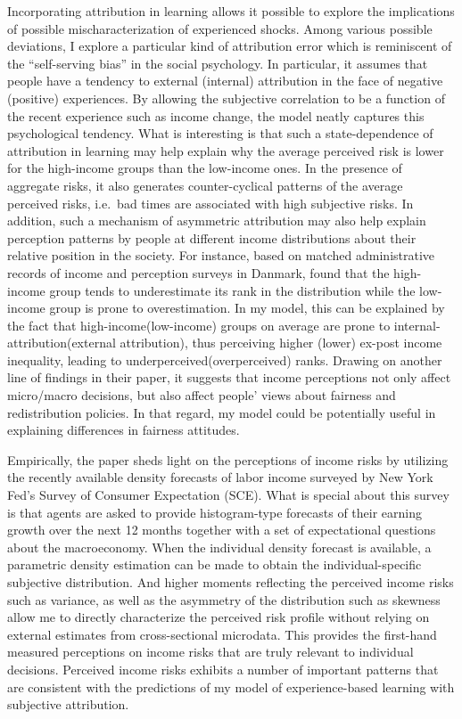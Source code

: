 \documentclass[12pt,notitlepage,onecolumn,aps,pra]{article}
\begin{document}
Incorporating attribution in learning allows it possible to explore the
implications of possible mischaracterization of experienced shocks.
Among various possible deviations, I explore a particular kind of
attribution error which is reminiscent of the ``self-serving bias'' in
the social psychology. In particular, it assumes that people have a
tendency to external (internal) attribution in the face of negative
(positive) experiences. By allowing the subjective correlation to be a
function of the recent experience such as income change, the model
neatly captures this psychological tendency. What is interesting is that
such a state-dependence of attribution in learning may help explain why
the average perceived risk is lower for the high-income groups than the
low-income ones. In the presence of aggregate risks, it also generates
counter-cyclical patterns of the average perceived risks, i.e.~bad times
are associated with high subjective risks. In addition, such a mechanism
of asymmetric attribution may also help explain perception patterns by
people at different income distributions about their relative position
in the society. For instance, based on matched administrative records of
income and perception surveys in Danmark, \cite{hvidberg2020social}
found that the high-income group tends to underestimate its rank in the
distribution while the low-income group is prone to overestimation. In
my model, this can be explained by the fact that high-income(low-income)
groups on average are prone to internal-attribution(external
attribution), thus perceiving higher (lower) ex-post income inequality,
leading to underperceived(overperceived) ranks. Drawing on another line
of findings in their paper, it suggests that income perceptions not only
affect micro/macro decisions, but also affect people' views about
fairness and redistribution policies. In that regard, my model could be
potentially useful in explaining differences in fairness attitudes.

Empirically, the paper sheds light on the perceptions of income risks by
utilizing the recently available density forecasts of labor income
surveyed by New York Fed's Survey of Consumer Expectation (SCE). What is
special about this survey is that agents are asked to provide
histogram-type forecasts of their earning growth over the next 12 months
together with a set of expectational questions about the macroeconomy.
When the individual density forecast is available, a parametric density
estimation can be made to obtain the individual-specific subjective
distribution. And higher moments reflecting the perceived income risks
such as variance, as well as the asymmetry of the distribution such as
skewness allow me to directly characterize the perceived risk profile
without relying on external estimates from cross-sectional microdata.
This provides the first-hand measured perceptions on income risks that
are truly relevant to individual decisions. Perceived income risks
exhibits a number of important patterns that are consistent with the
predictions of my model of experience-based learning with subjective
attribution.
\end{document}
